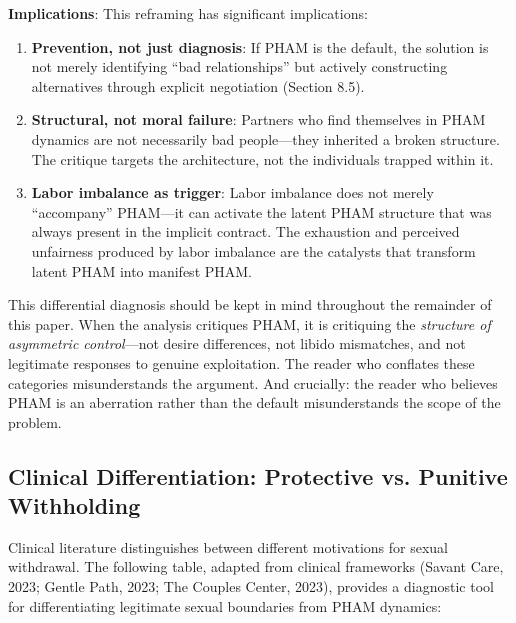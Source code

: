 \documentclass[12pt,openany]{book}
\numberwithin{equation}{chapter}
\begin{document}
\textbf{Implications}: This reframing has significant implications:

\begin{enumerate}
    \item \textbf{Prevention, not just diagnosis}: If PHAM is the default, the solution is not merely identifying ``bad relationships'' but actively constructing alternatives through explicit negotiation (Section 8.5).
    
    \item \textbf{Structural, not moral failure}: Partners who find themselves in PHAM dynamics are not necessarily bad people---they inherited a broken structure. The critique targets the architecture, not the individuals trapped within it.
    
    \item \textbf{Labor imbalance as trigger}: Labor imbalance does not merely ``accompany'' PHAM---it can activate the latent PHAM structure that was always present in the implicit contract. The exhaustion and perceived unfairness produced by labor imbalance are the catalysts that transform latent PHAM into manifest PHAM.
\end{enumerate}

This differential diagnosis should be kept in mind throughout the remainder of this paper. When the analysis critiques PHAM, it is critiquing the \textit{structure of asymmetric control}---not desire differences, not libido mismatches, and not legitimate responses to genuine exploitation. The reader who conflates these categories misunderstands the argument. And crucially: the reader who believes PHAM is an aberration rather than the default misunderstands the scope of the problem.

\subsection{Clinical Differentiation: Protective vs. Punitive Withholding}

Clinical literature distinguishes between different motivations for sexual withdrawal. The following table, adapted from clinical frameworks (Savant Care, 2023; Gentle Path, 2023; The Couples Center, 2023), provides a diagnostic tool for differentiating legitimate sexual boundaries from PHAM dynamics:
\end{document}
